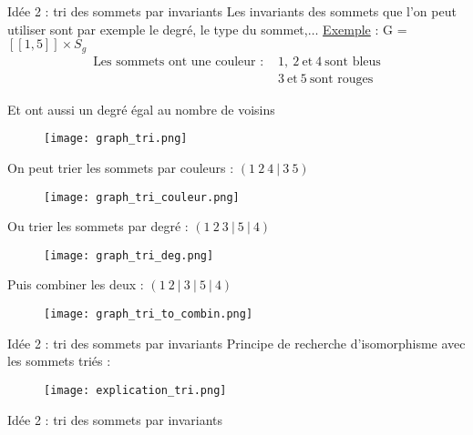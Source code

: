 \begin{frame}{Idée 2 : tri des sommets par invariants}
Les invariants des sommets que l'on peut utiliser sont par exemple le degré, le type du sommet,$\dots$ \newline\newline
\underline{Exemple} : G = $[\![1,5]\!] \times S_g$
\begin{align*}
\text{Les sommets ont une couleur : }
    & 1 ,\ 2\ \text{et}\ 4\ \text{sont bleus} \\
    & 3\ \text{et}\ 5\ \text{sont rouges}
\end{align*}
\begin{center}
Et ont aussi un degré égal au nombre de voisins
\end{center}
\begin{figure}[!htb]
    \texttt{[image: graph\_tri.png]}
\end{figure}


\end{frame}
\footnotesize
\begin{frame}
    \begin{center}
        On peut trier les sommets par couleurs : $(1\ 2\ 4\ |\ 3\ 5)$
        \begin{figure}[!htb]
        \texttt{[image: graph\_tri\_couleur.png]}
        \end{figure}
        Ou trier les sommets par degré : $(1\ 2\ 3\ |\ 5\ |\ 4)$
        \begin{figure}[!htb]
        \texttt{[image: graph\_tri\_deg.png]}
        \end{figure}
        Puis combiner les deux :  $(1\ 2\ |\ 3\ |\ 5\ |\ 4)$
        \begin{figure}[!htb]
        \texttt{[image: graph\_tri\_to\_combin.png]}
        \end{figure}
    \end{center}
\end{frame}

\begin{frame}{Idée 2 : tri des sommets par invariants}
Principe de recherche d'isomorphisme avec les sommets triés :
\begin{figure}[!htb]
    \texttt{[image: explication\_tri.png]}
    \end{figure}
\end{frame}

\begin{frame}{Idée 2 : tri des sommets par invariants}
    

\end{frame}

